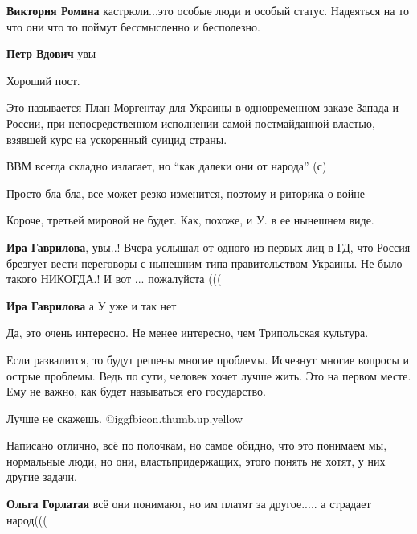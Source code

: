 \begin{itemize}
\begin{itemize}
\textbf{Виктория Ромина} кастрюли...это особые люди и особый статус.
Надеяться на то что они что то поймут бессмысленно и бесполезно.

\textbf{Петр Вдович} увы
\end{itemize} %

Хороший пост.


Это называется План Моргентау для Украины в одновременном заказе Запада и
России, при непосредственном исполнении самой постмайданной властью, взявшей
курс на ускоренный суицид страны.

ВВМ всегда складно излагает, но \enquote{как далеки они от народа} (с)

Просто бла бла, все может резко изменится, поэтому и риторика о войне

Короче, третьей мировой не будет. Как, похоже, и У. в ее нынешнем виде.

\begin{itemize} %
\textbf{Ира Гаврилова}, увы..! Вчера услышал от одного из первых лиц в ГД, что Россия брезгует вести переговоры с нынешним типа правительством Украины. Не было такого НИКОГДА.! И вот ... пожалуйста (((

\textbf{Ира Гаврилова} а У уже и так нет

\end{itemize} %

Да, это очень интересно. Не менее интересно, чем Трипольская культура.


Если развалится, то будут решены многие проблемы. Исчезнут многие вопросы и
острые проблемы. Ведь по сути, человек хочет лучше жить. Это на первом месте.
Ему не важно, как будет называться его государство.

Лучше не скажешь.  @igg{fbicon.thumb.up.yellow} 


Написано отлично, всё по полочкам, но самое обидно, что это понимаем
мы, нормальные люди, но они, властьпридержащих, этого понять не хотят, у них
другие задачи.

\begin{itemize} %
\textbf{Ольга Горлатая} всё они понимают, но им платят за другое..... а страдает народ(((


\end{itemize}
\end{itemize}
